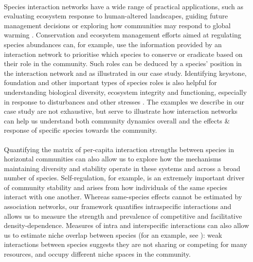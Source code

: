 \documentclass[a4,12pt]{article}
\begin{document}
    \paragraph{}
    Species interaction networks have a wide range of practical applications, such as evaluating ecosystem response to human-altered landscapes, guiding future management decisions \parencite{Ross2011} or exploring how communities may respond to global warming \parencite{Gorman2019}. Conservation and ecosystem management efforts aimed at regulating species abundances can, for example, use the information provided by an interaction network to prioritise which species to conserve or eradicate based on their role in the community. Such roles can be deduced by a species' position in the interaction network \parencite{Cirtwill2018a} and as illustrated in our case study. Identifying keystone, foundation and other important types of species roles is also helpful for understanding biological diversity, ecosystem integrity and functioning, especially in response to disturbances and other stresses \parencite{Nyakatya2008, Orwin2016, Losapio2017, Narwani2019}. The examples we describe in our case study are not exhaustive, but serve to illustrate how interaction networks can help us understand both community dynamics overall and the effects \& response of specific species towards the community. 

    \paragraph{}
    Quantifying the matrix of per-capita interaction strengths between species in horizontal communities can also allow us to explore how the mechanisms maintaining diversity and stability operate in these systems and across a broad number of species. Self-regulation, for example, is an extremely important driver of community stability \parencite{Barabas2017} and arises from how individuals of the same species interact with one another. Whereas same-species effects cannot be estimated by association networks, our framework quantifies intraspecific interactions and allows us to measure the strength and prevalence of competitive and facilitative density-dependence. Measures of intra and interspecific interactions can also allow us to estimate niche overlap between species (for an example, see \cite{Chu2015a}): weak interactions between species suggests they are not sharing or competing for many resources, and occupy different niche spaces in the community. %
\end{document}
